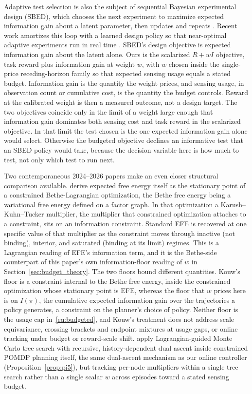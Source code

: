 Adaptive test selection is also the subject of sequential Bayesian experimental design (SBED), which chooses the next experiment to maximize expected information gain about a latent parameter, then updates and repeats \citep{lindley1956}. Recent work amortizes this loop with a learned design policy so that near-optimal adaptive experiments run in real time \citep{foster2021dad}. SBED's design objective is expected information gain about the latent alone. Ours is the scalarized $R + wI$ objective, task reward plus information gain at weight $w$, with $w$ chosen inside the single-price receding-horizon family so that expected sensing usage equals a stated budget. Information gain is the quantity the weight prices, and sensing usage, in observation count or cumulative cost, is the quantity the budget controls. Reward at the calibrated weight is then a measured outcome, not a design target. The two objectives coincide only in the limit of a weight large enough that information gain dominates both sensing cost and task reward in the scalarized objective. In that limit the test chosen is the one expected information gain alone would select. Otherwise the budgeted objective declines an informative test that an SBED policy would take, because the decision variable here is how much to test, not only which test to run next.

Two contemporaneous 2024--2026 papers make an even closer structural comparison available. \citet{kouw2026bethe} derive expected free energy itself as the stationary point of a constrained Bethe-Lagrangian optimization, the Bethe free energy being a variational free energy defined on a factor graph. In that optimization a Karush--Kuhn--Tucker multiplier, the multiplier that constrained optimization attaches to a constraint, sits on an information constraint. Standard EFE is recovered at one specific value of that multiplier as the constraint moves through inactive (not binding), interior, and saturated (binding at its limit) regimes. This is a Lagrangian reading of EFE's information term, and it is the Bethe-side counterpart of this paper's own information-floor reading of $w$ in Section~\ref{sec:budget_theory}. The two floors bound different quantities. Kouw's floor is a constraint internal to the Bethe free energy, inside the constrained optimization whose stationary point is EFE, whereas the floor that $w$ prices here is on $I(\pi)$, the cumulative expected information gain over the trajectories a policy generates, a constraint on the planner's choice of policy. Neither floor is the usage cap in~\eqref{eq:budgeted}, and Kouw's treatment does not address scale equivariance, crossing brackets and endpoint mixtures at usage gaps, or online tracking under budget or reward-scale shift. \citet{stocco2024recursive} apply Lagrangian-guided Monte Carlo tree search with recursive, history-dependent dual ascent inside constrained POMDP planning itself, the same dual-ascent mechanism as our online controller (Proposition~\ref{prop:pi5}), but tracking per-node multipliers within a single tree search rather than a single scalar $w$ across episodes toward a stated sensing budget.

